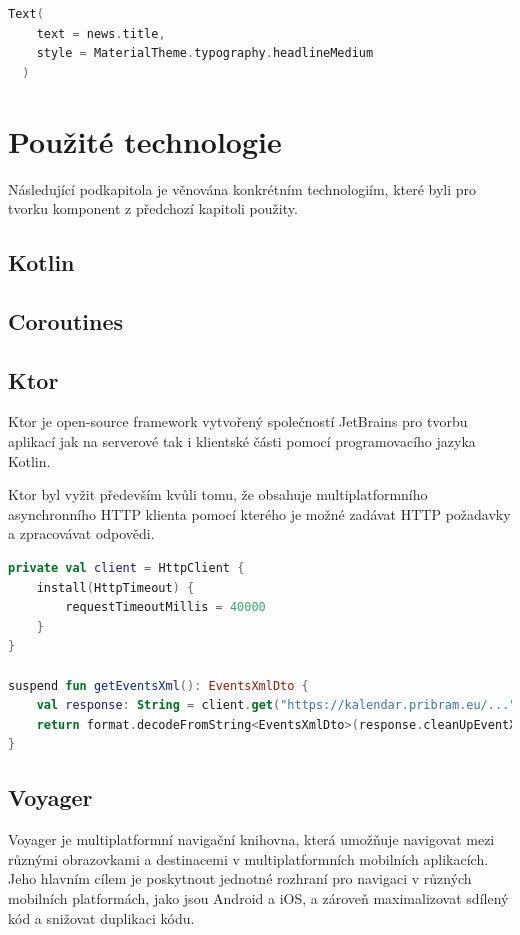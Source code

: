 \begin{lstlisting}[caption={Ukázka použití stylu písma}, label={lst:typographyExample}, language=Kotlin]
  Text(
    text = news.title,
    style = MaterialTheme.typography.headlineMedium
  )
\end{lstlisting}

\section{Použité technologie}
Následující podkapitola je věnována konkrétním technologiím, které byli pro tvorku komponent z předchozí kapitoli použity.

\subsection{Kotlin}
\subsection{Coroutines}
\subsection{Ktor}
Ktor je open-source framework vytvořený společností JetBrains pro tvorbu aplikací jak na serverové tak i klientské části pomocí programovacího 
jazyka Kotlin.

Ktor byl vyžit především kvůli tomu, že obsahuje multiplatformního asynchronního HTTP klienta pomocí kterého je možné zadávat HTTP požadavky a 
zpracovávat odpovědi. 

\begin{lstlisting}[caption={Definice barevných motivů}, label={lst:colorsDef}, language=Kotlin]
  private val client = HttpClient {
    install(HttpTimeout) {
        requestTimeoutMillis = 40000
    }
}

suspend fun getEventsXml(): EventsXmlDto {
    val response: String = client.get("https://kalendar.pribram.eu/...").body()
    return format.decodeFromString<EventsXmlDto>(response.cleanUpEventXml())
}
\end{lstlisting}

\subsection{Voyager}
Voyager je multiplatformní navigační knihovna, která umožňuje navigovat mezi různými obrazovkami a destinacemi v multiplatformních mobilních
 aplikacích. \cite{voyager} Jeho hlavním cílem je poskytnout jednotné rozhraní pro navigaci v různých mobilních platformách, jako jsou Android a iOS, a 
 zároveň maximalizovat sdílený kód a snižovat duplikaci kódu.

